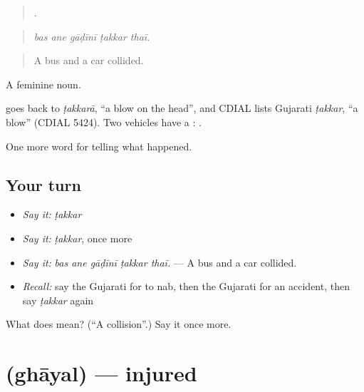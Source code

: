\begin{quote}
    .
\end{quote}

\begin{quote}
\emph{bas ane gāḍīnī ṭakkar thaī.}
\end{quote}

\begin{quote}
A bus and a car collided.
\end{quote}

A feminine noun.

\begin{cousinweb}
goes back to \emph{ṭakkarā}, \textquotedblleft{}a blow on the head\textquotedblright{}, and CDIAL lists Gujarati \emph{ṭakkar}, \textquotedblleft{}a blow\textquotedblright{} (CDIAL 5424). Two vehicles have a \textbf{}: \textbf{    }.
\end{cousinweb}

\begin{grammarlens}[title={What you've built}]
One more word for telling what happened.
\end{grammarlens}

\subsection*{Your turn}
\begin{itemize}
\raggedright
  \item \emph{Say it:} \emph{ṭakkar}
  \item \emph{Say it:} \emph{ṭakkar}, once more
  \item \emph{Say it:} \emph{bas ane gāḍīnī ṭakkar thaī.} — A bus and a car collided.
  \item \emph{Recall:} say the Gujarati for to nab, then the Gujarati for an accident, then say \emph{ṭakkar} again
\end{itemize}

\begin{tcolorbox}[breakable,colback=teal!4,colframe=teal!35!black,title={Before you move on}]
What does  mean? (\textquotedblleft{}A collision\textquotedblright{}.) Say it once more.
\end{tcolorbox}
\section[\texorpdfstring{\gu{ઘાયલ} (ghāyal)}{ઘાયલ (ghāyal)}]{ (ghāyal) — injured}

